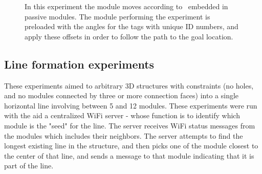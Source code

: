 \begin{figure}[h]
\begin{subfigure}[b]{0.23\linewidth}
	\end{subfigure}
	\caption{In this experiment the module moves according to \tagNamePlural~embedded in passive modules. The module performing the experiment is preloaded with the angles for the tags with unique ID numbers, and apply these offsets in order to follow the path to the goal location.}
	\label{fig:arrowExperiment}
\end{figure}

\subsection{Line formation experiments}
\label{sec:mblocksExperimentsLine}

These experiments aimed to arbitrary 3D structures with constraints (no holes, and no modules connected by three or more connection faces) into a single horizontal line involving between 5 and 12 modules. These experiments were run with the aid a centralized WiFi server - whose function is to identify which module is the "seed" for the line. The server receives WiFi  status messages from the modules which includes their neighbors. The server attempts to find the longest existing line in the structure, and then picks one of the module closest to the center of that line, and sends a message to that module indicating that it is part of the line. 


